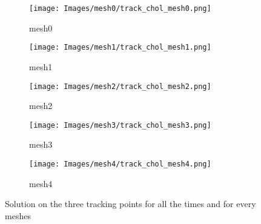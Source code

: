 \begin{figure}[htbp]
    \centering
    \begin{subfigure}{0.45\textwidth}
        \centering
        \texttt{[image: Images/mesh0/track\_chol\_mesh0.png]}
        \caption{mesh0}
    \end{subfigure}
    \hfill
    \begin{subfigure}{0.45\textwidth}
        \centering
        \texttt{[image: Images/mesh1/track\_chol\_mesh1.png]}
        \caption{mesh1}
    \end{subfigure}
    \hfill
    \begin{subfigure}{0.45\textwidth}
        \centering
        \texttt{[image: Images/mesh2/track\_chol\_mesh2.png]}
        \caption{mesh2}
    \end{subfigure}

    \vspace{1em} %

    \begin{subfigure}{0.45\textwidth}
        \centering
        \texttt{[image: Images/mesh3/track\_chol\_mesh3.png]}
        \caption{mesh3}
    \end{subfigure}
    \hfill
    \begin{subfigure}{0.45\textwidth}
        \centering
        \texttt{[image: Images/mesh4/track\_chol\_mesh4.png]}
        \caption{mesh4}
    \end{subfigure}

    \caption{Solution on the three tracking points for all the times and for every meshes}
    \label{fig: track point for all time}
\end{figure}



